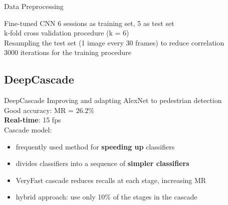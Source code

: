 \begin{frame}{Data Preprocessing}
  \small
{}

\end{frame}

\begin{frame}{Fine-tuned CNN}
  6 sessions as training set, 5 as test set\\
  \vspace{2mm}
  k-fold cross validation procedure (k = 6)\\
  \vspace{2mm}
  Resampling the test set (1 image every 30 frames) to reduce correlation\\
  \vspace{2mm}
  3000 iterations for the training procedure\\

\end{frame}

\subsection{DeepCascade}
\begin{frame}{DeepCascade}
  \small
  Improving and adapting AlexNet to pedestrian detection\\
  Good accuracy: MR = $26.2\%$\\
  \textbf{Real-time}: 15 fps\\
  Cascade model:
  \begin{itemize}
    \item frequently used method for \textbf{speeding up} classifiers
    \item divides classifiers into a sequence of \textbf{simpler classifiers}
    \item VeryFast cascade reduces recalls at each stage, increasing MR
    \item hybrid approach: use only 10\% of the stages in the cascade
  \end{itemize}
\end{frame}

